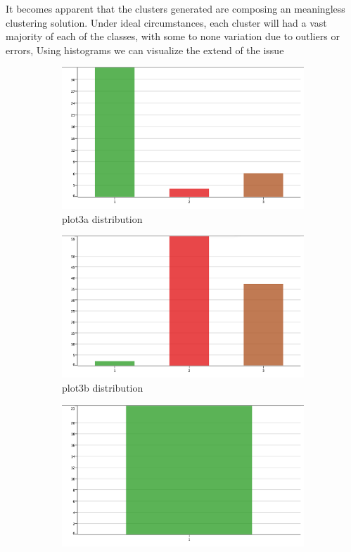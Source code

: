 \documentclass[11pt]{article}
\begin{document}
		 	\fi
			It becomes apparent that the clusters generated are composing an meaningless clustering solution. Under ideal circumstances, each cluster will had a vast majority of each of the classes, with some to none variation due to outliers or errors, Using histograms we can visualize the extend of the issue 
			\iffalse
			\begin{figure}[H]
				\centering
				\begin{subfigure}{0.4\textwidth}
			 		\includegraphics[width=\textwidth]{res/t1/t14/t14-plota-dist}
					\caption{plot3a distribution}
					\label{fig:first}
				\end{subfigure}
				\hfill
				\begin{subfigure}{0.4\textwidth}
			 		\includegraphics[width=\textwidth]{res/t1/t14/t14-plotb-dist}
					\caption{plot3b distribution}
					\label{fig:second}
				\end{subfigure}
				\hfill
				\begin{subfigure}{0.4\textwidth}
			 		\includegraphics[width=\textwidth]{res/t1/t14/t14-plotc-dist}

\end{subfigure}
\end{figure}
\end{document}
